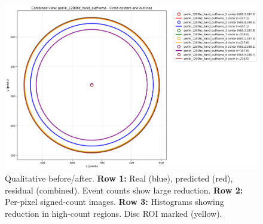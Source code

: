 \begin{figure}[t]
  \centering
  \includegraphics[width=0.95\linewidth]{../code/pipeline/results_plots/perlin_1280hz_hand_outframe_combined_circles.png}
\caption{Qualitative before/after. \textbf{Row 1:} Real (blue), predicted (red), residual (combined). Event counts show large reduction. \textbf{Row 2:} Per-pixel signed-count images. \textbf{Row 3:} Histograms showing reduction in high-count regions. Disc ROI marked (yellow).}
  \label{fig:before_after}
\end{figure}

